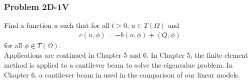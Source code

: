 \documentclass[../../main.tex]{subfiles}
\begin{document}
\subsubsection{Problem 2D-1V}\label{sssec:2D_Model:Problem2D1V}
Find a function $u$ such that for all $t>0$, $u \in T(\Omega)$ and 
\begin{align}
	c(u,\phi) = -b(u,\phi) + (Q,\phi) \label{eq:2D_Model:Problem2D1VEq}
\end{align}
for all $\phi \in T(\Omega)$.\\

 Applications are continued in Chapter 5 and 6. In Chapter 5, the finite element method is applied to a cantilever beam to solve the eigenvalue problem. In Chapter 6, a cantilever beam in used in the comparison of our linear models.
\end{document}
